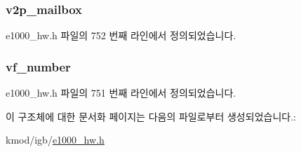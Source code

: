 \subsubsection[{\texorpdfstring{v2p\+\_\+mailbox}{v2p_mailbox}}]{ v2p\+\_\+mailbox}\hypertarget{structe1000__dev__spec__vf_a89b413c76c22275baa958b21f0fbc8b2}{}\label{structe1000__dev__spec__vf_a89b413c76c22275baa958b21f0fbc8b2}


e1000\+\_\+hw.\+h 파일의 752 번째 라인에서 정의되었습니다.

\subsubsection[{\texorpdfstring{vf\+\_\+number}{vf_number}}]{ vf\+\_\+number}\hypertarget{structe1000__dev__spec__vf_a1b427874ff64ff83cebe67db32af1b2d}{}\label{structe1000__dev__spec__vf_a1b427874ff64ff83cebe67db32af1b2d}


e1000\+\_\+hw.\+h 파일의 751 번째 라인에서 정의되었습니다.



이 구조체에 대한 문서화 페이지는 다음의 파일로부터 생성되었습니다.\+:\begin{DoxyCompactItemize}
\item 
kmod/igb/\hyperlink{kmod_2igb_2e1000__hw_8h}{e1000\+\_\+hw.\+h}\end{DoxyCompactItemize}
